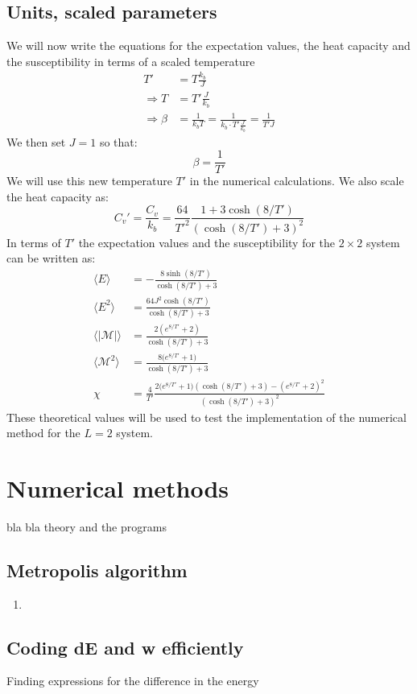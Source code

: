 \documentclass[11pt,a4wide]{article}
\begin{document}
\subsection{Units, scaled parameters}
We will now write the equations for the expectation values, the heat capacity and the susceptibility in terms of a scaled temperature
\begin{align*}
T' &= T \frac{k_b}{J} \\
\Rightarrow T &= T'\frac{J}{k_b}\\
\Rightarrow \beta &= \frac{1}{k_bT} = \frac{1}{k_b\cdot T'\frac{J}{k_b}} = \frac{1}{T'J}
\end{align*}
We then set $J=1$ so that:
\[
\beta = \frac{1}{T'}
\]
We will use this new temperature $T'$ in the numerical calculations. We also scale the heat capacity as:
\[
C_v' = \frac{C_v}{k_b} = \frac{64}{T'^2} \frac{1 + 3\cosh(8/T')}{(\cosh(8/T') + 3)^2} 
\]
In terms of $T'$ the expectation values and the susceptibility for the $2\times 2$ system can be written as:
\begin{align}
\langle E \rangle &= -\frac{8\sinh(8/T')}{\cosh(8/T') + 3} \\
\langle E^2 \rangle &=\frac{64J^2 \cosh(8/T')}{\cosh(8/T') + 3} \\
\langle |\mathcal{M}| \rangle &= \frac{2(e^{8/T'}+ 2)}{\cosh(8/T') + 3}\\
\langle \mathcal{M}^2 \rangle &= \frac{8\big(e^{8/T'} + 1\big)}{\cosh(8/T') + 3} \\
\chi &= \frac{4}{T'} \frac{2(e^{8/T'} + 1\big)(\cosh(8/T') + 3) - (e^{8/T'}+ 2)^2}{(\cosh(8/T') + 3)^2} 
\end{align}
These theoretical values will be used to test the implementation of the numerical method for the $L=2$ system. 


\section{Numerical methods}
bla bla theory and the programs
\subsection{Metropolis algorithm}

\begin{enumerate}
\item 
\end{enumerate}


\subsection{Coding dE  and w efficiently}
Finding expressions for the difference in the energy 
\end{document}
